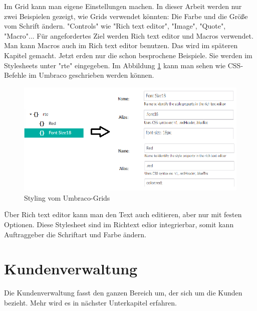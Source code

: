  Im Grid kann man eigene Einstellungen machen. In dieser Arbeit werden nur zwei Beispielen gezeigt, wie Grids verwendet könnten: Die Farbe und die Größe vom Schrift ändern. "Controls" wie "Rich text editor", "Image", "Quote", "Macro"... Für angefordertes Ziel werden Rich text editor und Macros verwendet. Man kann Macros auch im Rich text editor benutzen. Das wird im späteren Kapitel gemacht. Jetzt erden nur die schon besprochene Beispiele. Sie werden im Stylesheets unter "rte" eingegeben. Im Abbildung \ref{fig:StylingGrind} kann man sehen wie CSS-Befehle im Umbraco geschrieben werden können.
     
     \begin{figure}[h]
     	\centering
     	\includegraphics[width=0.6\linewidth]{Graphics/StylingGrind.png}
     	\caption[StylingGrind]{Styling vom Umbraco-Grids}
     	\label{fig:StylingGrind}
     \end{figure}
     
Über Rich text editor kann man den Text auch editieren, aber nur mit festen Optionen. 
Diese Stylesheet sind im Richtext edior integrierbar, somit kann Auftraggeber die Schriftart und Farbe ändern. 

\section{Kundenverwaltung}
Die Kundenverwaltung fasst den ganzen Bereich um, der sich um die Kunden bezieht. Mehr wird es in nächster Unterkapitel erfahren.


